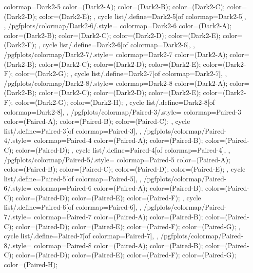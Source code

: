 {{    colormap={Dark2-5}{
      color=(Dark2-A);
      color=(Dark2-B);
      color=(Dark2-C);
      color=(Dark2-D);
      color=(Dark2-E);
    },
    cycle list/.define={Dark2-5}{[of colormap=Dark2-5]},
  },
  /pgfplots/colormap/Dark2-6/.style={
    colormap={Dark2-6}{
      color=(Dark2-A);
      color=(Dark2-B);
      color=(Dark2-C);
      color=(Dark2-D);
      color=(Dark2-E);
      color=(Dark2-F);
    },
    cycle list/.define={Dark2-6}{[of colormap=Dark2-6]},
  },
  /pgfplots/colormap/Dark2-7/.style={
    colormap={Dark2-7}{
      color=(Dark2-A);
      color=(Dark2-B);
      color=(Dark2-C);
      color=(Dark2-D);
      color=(Dark2-E);
      color=(Dark2-F);
      color=(Dark2-G);
    },
    cycle list/.define={Dark2-7}{[of colormap=Dark2-7]},
  },
  /pgfplots/colormap/Dark2-8/.style={
    colormap={Dark2-8}{
      color=(Dark2-A);
      color=(Dark2-B);
      color=(Dark2-C);
      color=(Dark2-D);
      color=(Dark2-E);
      color=(Dark2-F);
      color=(Dark2-G);
      color=(Dark2-H);
    },
    cycle list/.define={Dark2-8}{[of colormap=Dark2-8]},
  },
  /pgfplots/colormap/Paired-3/.style={
    colormap={Paired-3}{
      color=(Paired-A);
      color=(Paired-B);
      color=(Paired-C);
    },
    cycle list/.define={Paired-3}{[of colormap=Paired-3]},
  },
  /pgfplots/colormap/Paired-4/.style={
    colormap={Paired-4}{
      color=(Paired-A);
      color=(Paired-B);
      color=(Paired-C);
      color=(Paired-D);
    },
    cycle list/.define={Paired-4}{[of colormap=Paired-4]},
  },
  /pgfplots/colormap/Paired-5/.style={
    colormap={Paired-5}{
      color=(Paired-A);
      color=(Paired-B);
      color=(Paired-C);
      color=(Paired-D);
      color=(Paired-E);
    },
    cycle list/.define={Paired-5}{[of colormap=Paired-5]},
  },
  /pgfplots/colormap/Paired-6/.style={
    colormap={Paired-6}{
      color=(Paired-A);
      color=(Paired-B);
      color=(Paired-C);
      color=(Paired-D);
      color=(Paired-E);
      color=(Paired-F);
    },
    cycle list/.define={Paired-6}{[of colormap=Paired-6]},
  },
  /pgfplots/colormap/Paired-7/.style={
    colormap={Paired-7}{
      color=(Paired-A);
      color=(Paired-B);
      color=(Paired-C);
      color=(Paired-D);
      color=(Paired-E);
      color=(Paired-F);
      color=(Paired-G);
    },
    cycle list/.define={Paired-7}{[of colormap=Paired-7]},
  },
  /pgfplots/colormap/Paired-8/.style={
    colormap={Paired-8}{
      color=(Paired-A);
      color=(Paired-B);
      color=(Paired-C);
      color=(Paired-D);
      color=(Paired-E);
      color=(Paired-F);
      color=(Paired-G);
      color=(Paired-H);
}}}
